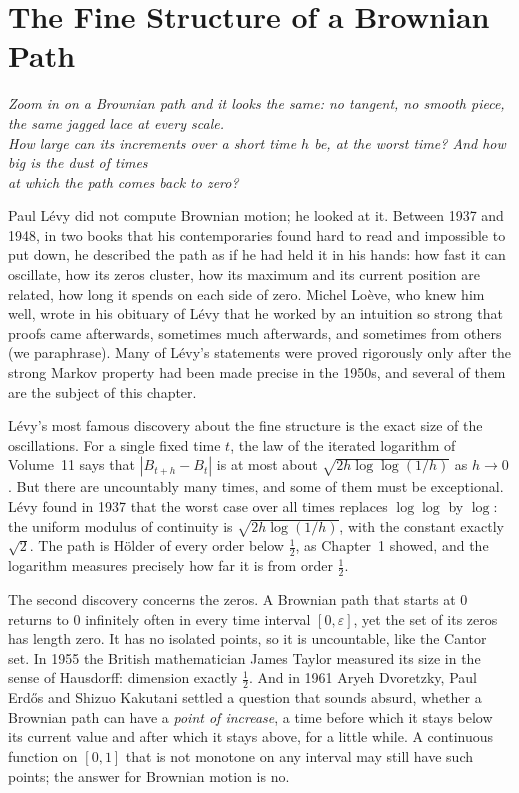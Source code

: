 \chapter{The Fine Structure of a Brownian Path}

\begin{center}\itshape
Zoom in on a Brownian path and it looks the same: no tangent, no smooth piece, the same jagged lace at every scale.\\
How large can its increments over a short time $h$ be, at the worst time? And how big is the dust of times\\
at which the path comes back to zero?
\end{center}

Paul L\'evy did not compute Brownian motion; he looked at it. Between 1937 and 1948, in two books that his contemporaries found hard to read and impossible to
put down, he described the path as if he had held it in his hands: how fast it can oscillate, how its zeros cluster, how its maximum and its current position are
related, how long it spends on each side of zero. Michel Lo\`eve, who knew him well, wrote in his obituary of L\'evy that he worked by an intuition so strong that proofs
came afterwards, sometimes much afterwards, and sometimes from others (we paraphrase). Many of L\'evy's statements were proved rigorously only after the strong Markov
property had been made precise in the 1950s, and several of them are the subject of this chapter.

L\'evy's most famous discovery about the fine structure is the exact size of the oscillations. For a single fixed time $t$, the law of the iterated logarithm of Volume~11
says that $|B_{t+h}-B_t|$ is at most about $\sqrt{2h\log\log(1/h)}$ as $h\to0$. But there are uncountably many times, and some of them must be exceptional. L\'evy found in
1937 that the worst case over all times replaces $\log\log$ by $\log$: the uniform modulus of continuity is $\sqrt{2h\log(1/h)}$, with the constant exactly $\sqrt2$. The path is
H\"older of every order below $\frac12$, as Chapter~1 showed, and the logarithm measures precisely how far it is from order $\frac12$.

The second discovery concerns the zeros. A Brownian path that starts at $0$ returns to $0$ infinitely often in every time interval $[0,\varepsilon]$, yet the set of its zeros
has length zero. It has no isolated points, so it is uncountable, like the Cantor set. In 1955 the British mathematician James Taylor measured its size in the sense of
Hausdorff: dimension exactly $\frac12$. And in 1961 Aryeh Dvoretzky, Paul Erd\H{o}s and Shizuo Kakutani settled a question that sounds absurd, whether a Brownian path
can have a \emph{point of increase}, a time before which it stays below its current value and after which it stays above, for a little while. A continuous function on
$[0,1]$ that is not monotone on any interval may still have such points; the answer for Brownian motion is no.


